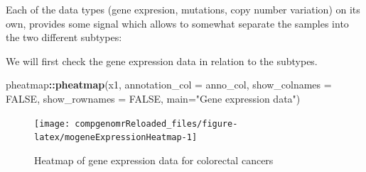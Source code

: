 \documentclass[12pt,]{krantz}
\newenvironment{Shaded}{\begin{snugshade}}{\end{snugshade}}
\newcommand{\CharTok}[1]{\textcolor[rgb]{0.31,0.60,0.02}{#1}}
\newcommand{\DataTypeTok}[1]{\textcolor[rgb]{0.13,0.29,0.53}{#1}}
\newcommand{\DecValTok}[1]{\textcolor[rgb]{0.00,0.00,0.81}{#1}}
\newcommand{\KeywordTok}[1]{\textcolor[rgb]{0.13,0.29,0.53}{\textbf{#1}}}
\newcommand{\NormalTok}[1]{#1}
\newcommand{\OperatorTok}[1]{\textcolor[rgb]{0.81,0.36,0.00}{\textbf{#1}}}
\newcommand{\OtherTok}[1]{\textcolor[rgb]{0.56,0.35,0.01}{#1}}
\newcommand{\StringTok}[1]{\textcolor[rgb]{0.31,0.60,0.02}{#1}}
\begin{document}
Each of the data types (gene expresion, mutations, copy number variation) on its own, provides some signal which allows to somewhat separate the samples into the two different subtypes:

\begin{Shaded}
\end{Shaded}

We will first check the gene expression data in relation to the subtypes.

\begin{Shaded}
\begin{Highlighting}[]
\NormalTok{pheatmap}\OperatorTok{::}\KeywordTok{pheatmap}\NormalTok{(x1,}
                   \DataTypeTok{annotation_col =}\NormalTok{ anno_col,}
                   \DataTypeTok{show_colnames =} \OtherTok{FALSE}\NormalTok{,}
                   \DataTypeTok{show_rownames =} \OtherTok{FALSE}\NormalTok{,}
                   \DataTypeTok{main=}\StringTok{"Gene expression data"}\NormalTok{)}
\end{Highlighting}
\end{Shaded}

\begin{figure}

{\centering \texttt{[image: compgenomrReloaded\_files/figure-latex/mogeneExpressionHeatmap-1]} 

}

\caption{Heatmap of gene expression data for colorectal cancers}\label{fig:mogeneExpressionHeatmap}
\end{figure}
\end{document}
